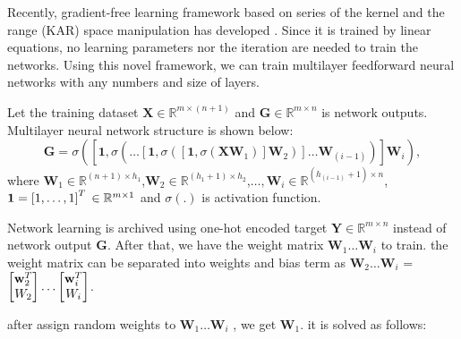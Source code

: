 \documentclass[runningheads]{llncs}
\begin{document}
Recently, gradient-free learning framework based on series of the kernel and the range (KAR) space manipulation has developed \cite{toh2018learning,toh2018gradient}.
Since it is trained by linear equations, no learning parameters nor the iteration are needed to train the networks.
Using this novel framework, we can train multilayer feedforward neural networks with any numbers and size of layers.

Let the training dataset $\mathbf{X}\in{\mathbb{R}}^{m \times (n+1)}$ and $\mathbf{G}\in{\mathbb{R}}^{m \times n}$ is network outputs.
Multilayer neural network structure is shown below:
\begin{equation}
    \mathbf{G} = \sigma\left(\left[\mathbf{1},\sigma\left(\dots\left[\mathbf{1},\sigma\left(\left[\mathbf{1},\sigma\left(\mathbf{X}\mathbf{W}_{1}\right)\right]\mathbf{W}_{2}\right)\right]\dots\mathbf{W}_{(i-1)}\right)\right]\mathbf{W}_{i}\right),
\end{equation}
where $\mathbf{W}_{1}\in{\mathbb{R}}^{(n+1) \times h_{1}}$,$\mathbf{W}_{2}\in{\mathbb{R}}^{(h_{1}+1) \times h_{2}}$,$\dots,\mathbf{W}_{i}\in{\mathbb{R}}^{(h_{(i-1)}+1) \times n}$,$\mathbf{1}=\left[1,\dots,1\right]^{T}\\
\in{\mathbb{R}}^{m \times 1}$ and $\sigma(.)$ is activation function.

Network learning is archived using one-hot encoded target $\mathbf{Y}\in{\mathbb{R}}^{m \times n}$ instead of network output $\mathbf{G}$.
After that, we have the weight matrix $\mathbf{W}_{1}\dots\mathbf{W}_{i}$ to train. the weight matrix can be separated into weights and bias term as
$\mathbf{W}_{2}\dots\mathbf{W}_{i}$ = 
$\begin{bmatrix}
\mathbf{w}_{2}^{T}\\\mathnormal{W}_{2}
\end{bmatrix}
\dots
\begin{bmatrix}
\mathbf{w}_{i}^{T}\\\mathnormal{W}_{i}
\end{bmatrix}$.

after assign random weights to $\mathbf{W}_{1}\dots\mathbf{W}_{i}$ , we get $\mathbf{W}_{1}$. it is solved as follows:
\end{document}
